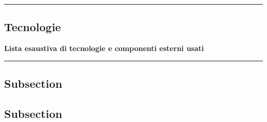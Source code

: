 {\color{gray}\hrule}
\begin{center}
\section{Tecnologie}
\textbf{Lista esaustiva di tecnologie e componenti esterni usati}
\bigskip
\end{center}
{\color{gray}\hrule}

\subsection{Subsection}
\lipsum[1]
\subsection{Subsection}
\lipsum[1-3]

\pagebreak
